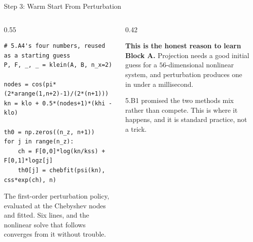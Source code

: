 \begin{frame}[fragile]{Step 3: Warm Start From Perturbation}
\begin{columns}[T]
\begin{column}{0.55\textwidth}
\begin{lstlisting}
# 5.A4's four numbers, reused as a starting guess
P, F, _, _ = klein(A, B, n_x=2)

nodes = cos(pi*(2*arange(1,n+2)-1)/(2*(n+1)))
kn = klo + 0.5*(nodes+1)*(khi - klo)

th0 = np.zeros((n_z, n+1))
for j in range(n_z):
    ch = F[0,0]*log(kn/kss) + F[0,1]*logz[j]
    th0[j] = chebfit(psi(kn), css*exp(ch), n)
\end{lstlisting}
\medskip
\small
The first-order perturbation policy, evaluated at the Chebyshev nodes and fitted. Six lines, and the nonlinear solve that follows converges from it without trouble.
\end{column}
\begin{column}{0.42\textwidth}
\begin{takeawaybox}\footnotesize
\textbf{This is the honest reason to learn Block A.} Projection needs a good initial guess for a $56$-dimensional nonlinear system, and perturbation produces one in under a millisecond.
\end{takeawaybox}
\medskip
\begin{examplebox}\footnotesize
5.B1 promised the two methods mix rather than compete. This is where it happens, and it is standard practice, not a trick.
\end{examplebox}
\end{column}
\end{columns}
\vspace{1mm}
\end{frame}

